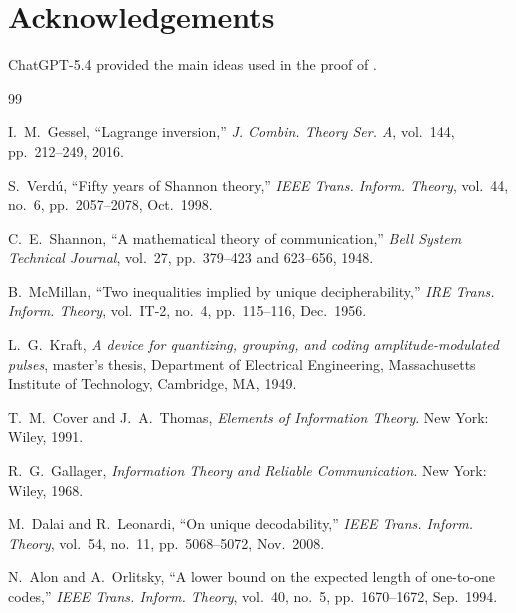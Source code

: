 \documentclass[10pt,a4paper]{article}
\theoremstyle{definition}
\theoremstyle{remark}
\newcommand{\1}{\mathbf{1}}
\begin{document}
\section*{Acknowledgements}
ChatGPT-5.4 provided the main ideas used in the proof of .

\begin{thebibliography}{99}

I.~M.~Gessel,
``Lagrange inversion,''
\emph{J. Combin. Theory Ser. A}, vol.~144, pp.~212--249, 2016.

S.~Verd\'u,
``Fifty years of Shannon theory,''
\emph{IEEE Trans. Inform. Theory}, vol.~44, no.~6, pp.~2057--2078, Oct.~1998.

C.~E.~Shannon,
``A mathematical theory of communication,''
\emph{Bell System Technical Journal}, vol.~27, pp.~379--423 and 623--656, 1948.

B.~McMillan,
``Two inequalities implied by unique decipherability,''
\emph{IRE Trans. Inform. Theory}, vol.~IT-2, no.~4, pp.~115--116, Dec.~1956.

L.~G.~Kraft,
\emph{A device for quantizing, grouping, and coding amplitude-modulated pulses},
master's thesis, Department of Electrical Engineering, Massachusetts Institute of Technology, Cambridge, MA, 1949.

T.~M.~Cover and J.~A.~Thomas,
\emph{Elements of Information Theory}.
New York: Wiley, 1991.

R.~G.~Gallager,
\emph{Information Theory and Reliable Communication}.
New York: Wiley, 1968.

M.~Dalai and R.~Leonardi,
``On unique decodability,''
\emph{IEEE Trans. Inform. Theory}, vol.~54, no.~11, pp.~5068--5072, Nov.~2008.

N.~Alon and A.~Orlitsky,
``A lower bound on the expected length of one-to-one codes,''
\emph{IEEE Trans. Inform. Theory}, vol.~40, no.~5, pp.~1670--1672, Sep.~1994.

\end{thebibliography}
\end{document}
